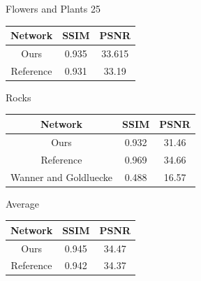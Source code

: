 \documentclass[10pt,twocolumn,letterpaper]{article}
\begin{document}
\begin{center}
Flowers and Plants 25

\begin{tabular}{|c c c|}
    \hline
    Network & SSIM & PSNR \\ \hline
    Ours & 0.935 & 33.615 \\
    Reference & 0.931 & 33.19 \\ 
    \hline
\end{tabular}
\end{center}
            
\begin{center}
Rocks

\begin{tabular}{|c c c|}
    \hline
    Network & SSIM & PSNR \\ \hline
    Ours & 0.932 & 31.46 \\
    Reference & 0.969 & 34.66 \\ 
    Wanner and Goldluecke & 0.488 & 16.57 \\
    \hline
\end{tabular}
\end{center}

\begin{center}
Average

\begin{tabular}{|c c c|}
    \hline
    Network & SSIM & PSNR \\ \hline
    Ours & 0.945 & 34.47 \\
    Reference & 0.942 & 34.37 \\ 
    \hline
\end{tabular}
\end{center}
\end{document}
